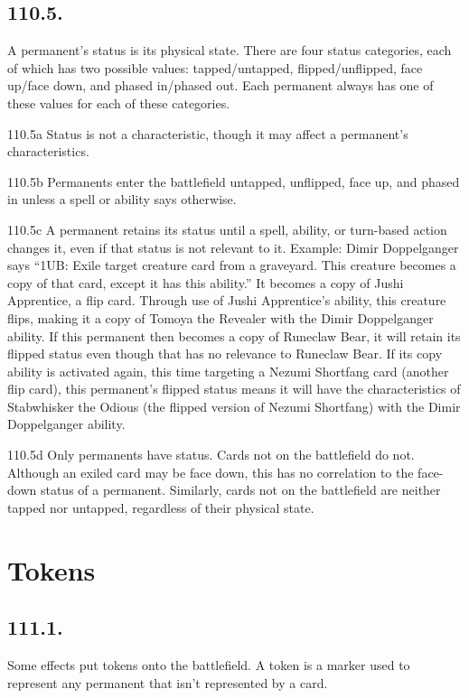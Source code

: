 \subsection*{110.5.}
A permanent’s status is its physical state. There are four status categories, each of which has two possible values: tapped/untapped, flipped/unflipped, face up/face down, and phased in/phased out. Each permanent always has one of these values for each of these categories.

110.5a Status is not a characteristic, though it may affect a permanent’s characteristics.

110.5b Permanents enter the battlefield untapped, unflipped, face up, and phased in unless a spell or ability says otherwise.

110.5c A permanent retains its status until a spell, ability, or turn-based action changes it, even if that status is not relevant to it.
Example: Dimir Doppelganger says “{1}{U}{B}: Exile target creature card from a graveyard. This creature becomes a copy of that card, except it has this ability.” It becomes a copy of Jushi Apprentice, a flip card. Through use of Jushi Apprentice’s ability, this creature flips, making it a copy of Tomoya the Revealer with the Dimir Doppelganger ability. If this permanent then becomes a copy of Runeclaw Bear, it will retain its flipped status even though that has no relevance to Runeclaw Bear. If its copy ability is activated again, this time targeting a Nezumi Shortfang card (another flip card), this permanent’s flipped status means it will have the characteristics of Stabwhisker the Odious (the flipped version of Nezumi Shortfang) with the Dimir Doppelganger ability.

110.5d Only permanents have status. Cards not on the battlefield do not. Although an exiled card may be face down, this has no correlation to the face-down status of a permanent. Similarly, cards not on the battlefield are neither tapped nor untapped, regardless of their physical state.

\section{Tokens}
\subsection*{111.1.}
Some effects put tokens onto the battlefield. A token is a marker used to represent any permanent that isn’t represented by a card.

